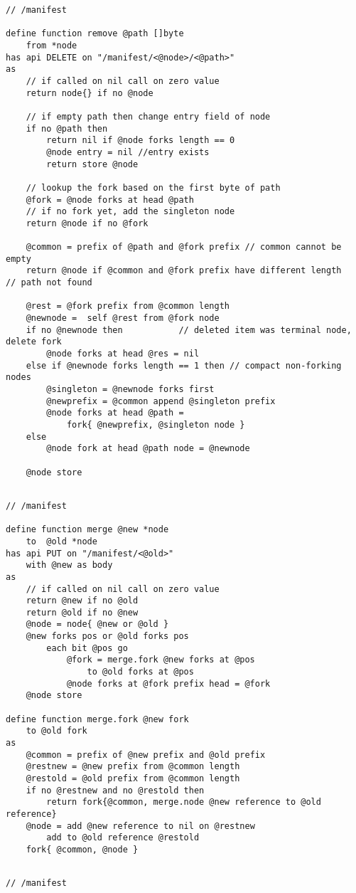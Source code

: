 \begin{definition}\label{def:manifest-remove}
\begin{lstlisting}[language=buzz1]
// /manifest

define function remove @path []byte 
    from *node
has api DELETE on "/manifest/<@node>/<@path>"
as
    // if called on nil call on zero value
    return node{} if no @node 

    // if empty path then change entry field of node
    if no @path then
        return nil if @node forks length == 0 
        @node entry = nil //entry exists
        return store @node

    // lookup the fork based on the first byte of path
    @fork = @node forks at head @path
    // if no fork yet, add the singleton node 
    return @node if no @fork

    @common = prefix of @path and @fork prefix // common cannot be empty
    return @node if @common and @fork prefix have different length          // path not found
    
    @rest = @fork prefix from @common length
    @newnode =  self @rest from @fork node               
    if no @newnode then           // deleted item was terminal node, delete fork 
        @node forks at head @res = nil
    else if @newnode forks length == 1 then // compact non-forking nodes 
        @singleton = @newnode forks first
        @newprefix = @common append @singleton prefix
        @node forks at head @path = 
            fork{ @newprefix, @singleton node }
    else
        @node fork at head @path node = @newnode
        
    @node store
    

\end{lstlisting}
\end{definition}


\begin{definition}\label{def:manifest-merge}
\begin{lstlisting}[language=buzz1]
// /manifest

define function merge @new *node  
    to  @old *node 
has api PUT on "/manifest/<@old>"
    with @new as body
as
    // if called on nil call on zero value
    return @new if no @old
    return @old if no @new
    @node = node{ @new or @old } 
    @new forks pos or @old forks pos 
        each bit @pos go 
            @fork = merge.fork @new forks at @pos
                to @old forks at @pos
            @node forks at @fork prefix head = @fork 
    @node store 

define function merge.fork @new fork 
    to @old fork    
as
    @common = prefix of @new prefix and @old prefix 
    @restnew = @new prefix from @common length
    @restold = @old prefix from @common length
    if no @restnew and no @restold then  
        return fork{@common, merge.node @new reference to @old reference}
    @node = add @new reference to nil on @restnew 
        add to @old reference @restold
    fork{ @common, @node }
         
\end{lstlisting}
\end{definition}

\begin{definition}\label{def:manifest-api}
\begin{lstlisting}[language=buzz1]
// /manifest


\end{lstlisting}
\end{definition}